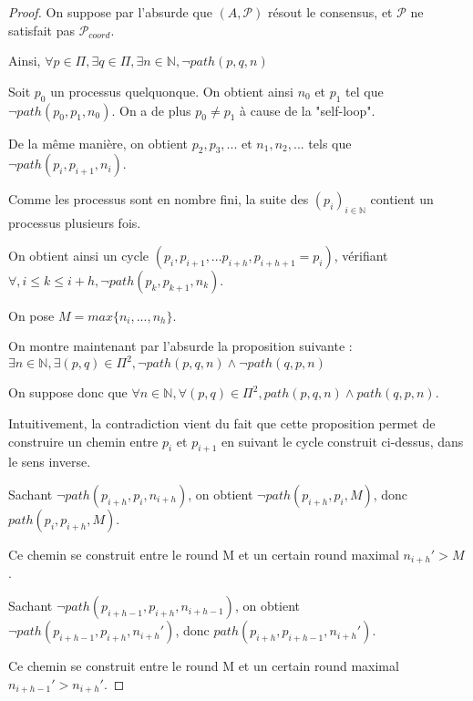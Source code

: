 \documentclass{article}
\begin{document}
\begin{proof}


On suppose par l'absurde que $(A, \mathcal{P})$ résout le consensus, et $\mathcal{P}$ ne satisfait pas $\mathcal{P}_{coord}$.

Ainsi, $\forall p \in \Pi, \exists q \in \Pi, \exists n \in \mathds{N}, \neg path(p, q, n)$ 

\vspace{0.5cm}

Soit $p_0$ un processus quelquonque. On obtient ainsi $n_0$ et $p_1$ tel que $\neg path(p_0, p_1, n_0)$. On a de plus $p_0 \neq p_1$ à cause de la "self-loop".

De la même manière, on obtient $p_2, p_3, ...$ et $n_1, n_2, ...$ tels que $\neg path(p_i, p_{i+1}, n_i)$. 

Comme les processus sont en nombre fini, la suite des $(p_i)_{i \in \mathds{N}}$ contient un processus plusieurs fois.

On obtient ainsi un cycle $(p_i, p_{i+1}, ... p_{i+h}, p_{i+h+1} =  p_i)$,
vérifiant $\forall, i \leq k \leq i+h, \neg path(p_k, p_{k+1}, n_k)$.

On pose $M = max \{ n_i, ..., n_h \}$.

\vspace{0.5cm}

On montre maintenant par l'absurde la proposition suivante :
$\exists n \in \mathds{N}, \exists (p, q) \in \Pi^2, \neg path(p,q, n) \wedge \neg path(q,p,n)$

On suppose donc que 
$\forall n \in \mathds{N}, \forall (p, q) \in \Pi^2, path(p,q, n) \wedge path(q,p,n)$.

Intuitivement, la contradiction vient du fait que cette proposition permet de construire un chemin
entre $p_i$ et $p_{i+1}$ en suivant le cycle construit ci-dessus, dans le sens inverse.

Sachant $\neg path(p_{i+h}, p_i, n_{i+h})$, on obtient $\neg path(p_{i+h}, p_i, M)$, donc
$path(p_i, p_{i+h}, M)$.

Ce chemin se construit entre le round M et un certain round maximal $n_{i+h}' > M$.

\vspace{0.2cm}

Sachant $\neg path(p_{i+h-1}, p_{i+h}, n_{i+h-1})$,
on obtient $\neg path(p_{i+h-1}, p_{i+h}, n_{i+h}')$,
donc $path(p_{i+h}, p_{i+h-1}, n_{i+h}')$.

Ce chemin se construit entre le round M et un certain round maximal $n_{i+h-1}' > n_{i+h}'$.


\end{proof}
\end{document}
